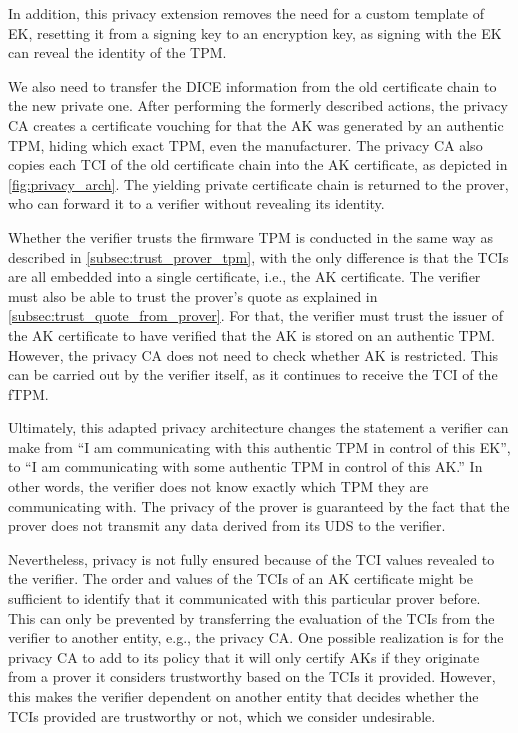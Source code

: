 In addition, this privacy extension removes the need for a custom template of \ac{EK}, resetting it from a signing key to an encryption key, as signing with the EK can reveal the identity of the TPM\@.



We also need to transfer the DICE information from the old certificate chain to the new private one.
After performing the formerly described actions, the privacy CA creates a certificate vouching for that the AK was generated by an authentic TPM, hiding which exact TPM, even the manufacturer.
The privacy CA also copies each TCI of the old certificate chain into the AK certificate, as depicted in \autoref{fig:privacy_arch}.
The yielding private certificate chain is returned to the prover, who can forward it to a verifier without revealing its identity.

Whether the verifier trusts the firmware TPM is conducted in the same way as described in \autoref{subsec:trust_prover_tpm}, with the only difference is that the TCIs are all embedded into a single certificate, i.e., the AK certificate.
The verifier must also be able to trust the prover's quote as explained in \autoref{subsec:trust_quote_from_prover}.
For that, the verifier must trust the issuer of the AK certificate to have verified that the \ac{AK} is stored on an authentic TPM\@.
However, the privacy CA does not need to check whether AK is restricted.
This can be carried out by the verifier itself, as it continues to receive the TCI of the fTPM\@.

Ultimately, this adapted privacy architecture changes the statement a verifier can make from ``I am communicating with this authentic TPM in control of this EK'', to ``I am communicating with some authentic TPM in control of this AK.''
In other words, the verifier does not know exactly which TPM they are communicating with.
The privacy of the prover is guaranteed by the fact that the prover does not transmit any data derived from its \ac{UDS} to the verifier.

Nevertheless, privacy is not fully ensured because of the TCI values revealed to the verifier.
The order and values of the TCIs of an AK certificate might be sufficient to identify that it communicated with this particular prover before.
This can only be prevented by transferring the evaluation of the TCIs from the verifier to another entity, e.g., the privacy CA\@.
One possible realization is for the privacy CA to add to its policy that it will only certify AKs if they originate from a prover it considers trustworthy based on the TCIs it provided.
However, this makes the verifier dependent on another entity that decides whether the TCIs provided are trustworthy or not, which we consider undesirable.

